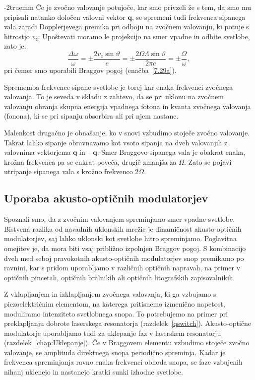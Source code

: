 \vglue-2truemm
Če je zvočno valovanje potujoče, kar smo privzeli že 
s tem, da smo mu pripisali natanko določen valovni vektor $\mathbf{q}$,
se spremeni tudi frekvenca sipanega vala zaradi Dopplerjevega premika
pri odboju na zvočnem valovanju, ki potuje s hitrostjo $v_{z}$. Upoštevati
moramo le projekcijo na smer vpadne in odbite svetlobe, zato je:
\begin{equation}
\frac{\Delta\omega}{\omega}=\pm\frac{2v_{z}\sin\vartheta}{c}=
\pm\frac{2\Omega\Lambda\sin\vartheta}{2 \pi c}=\pm\frac{\Omega}{\omega},
\label{7.32}
\end{equation}
pri čemer smo uporabili Braggov pogoj (enačba~\ref{7.29a}). 

Sprememba frekvence
sipane svetlobe je torej kar enaka frekvenci zvočnega valovanja. To je seveda v skladu 
z zahtevo, da se pri uklonu na zvočnem valovanju ohranja skupna energija
vpadnega fotona in kvanta zvočnega valovanja (fonona), ki se pri sipanju 
absorbira ali pri njem nastane.

Malenkost drugačno je obnašanje, ko v snovi vzbudimo stoječe zvočno valovanje. 
Takrat lahko sipanje obravnavamo kot vsoto sipanja na dveh valovanjih z valovnima 
vektorjema $\mathbf{q}$ in $-\mathbf{q}$. Smer Braggovo sipanega vala je obakrat enaka, 
krožna frekvenca pa se enkrat poveča, drugič zmanjša za $\Omega$. Zato se pojavi utripanje
sipanega vala s krožno frekvenco $2\Omega$.

\subsection*{Uporaba akusto-optičnih modulatorjev}
Spoznali smo, da z zvočnim valovanjem spreminjamo smer vpadne svetlobe.
Bistvena razlika od navadnih uklonskih mrežic je dinamičnost akusto-optičnih modulatorjev, 
saj lahko uklonski kot svetlobe hitro spreminjamo. Poglavitna omejitev je,
da mora biti vsaj približno izpolnjen Braggov pogoj. S kombinacijo dveh med seboj 
pravokotnih akusto-optičnih modulatorjev snop 
premikamo po ravnini, kar s pridom uporabljamo v različnih optičnih napravah, 
na primer v optičnih pincetah, optičnih bralnikih ali 
optičnih litografskih zapisovalnikih.

Z vklapljanjem in izklapljanjem zvočnega valovanja, ki ga vzbujamo s piezoelektričnim 
elementom, na katerega pritisnemo izmenično napetost, moduliramo intenziteto
svetlobnega snopa. To potrebujemo na primer pri preklapljanju
dobrote laserskega resonatorja (razdelek~\ref{qswitch}).
Akusto-optične modulatorje uporabljamo tudi za uklepanje faz
v laserskem resonatorju (razdelek~\ref{chap:Uklepanje}). Če v Braggovem 
elementu vzbudimo stoječe zvočno valovanje, se amplituda direktnega snopa 
periodično spreminja. Kadar je frekvenca spreminjanja ravno enaka frekvenci
obhoda snopa, se faze vzbujenih nihanj uklenejo in nastanejo kratki
sunki izhodne svetlobe.

